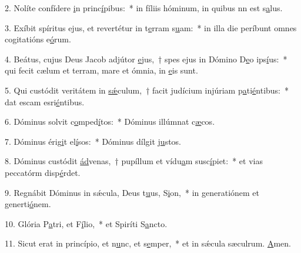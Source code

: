 2. Nolíte confídere \uline{i}n princ\uline{í}pibus:~* in fíliis hóminum, in quibus nn est s\uline{a}lus.\par 
3. Exíbit spíritus ejus, et revertétur in t\uline{e}rram s\uline{u}am:~* in illa die períbunt omnes cogitatións e\uline{ó}rum.\par 
4. Beátus, cujus Deus Jacob adjútor \uline{e}jus,~† spes ejus in Dómino D\uline{e}o ips\uline{í}us:~* qui fecit cælum et terram, mare et ómnia,  in \uline{e}is sunt.\par 
5. Qui custódit veritátem in \uline{sǽ}culum,~† facit judícium injúriam p\uline{a}ti\uline{é}ntibus:~* dat escam esri\uline{é}ntibus.\par 
6. Dóminus solvit c\uline{o}mped\uline{í}tos:~* Dóminus illúmnat c\uline{æ}cos.\par 
7. Dóminus érig\uline{i}t el\uline{í}sos:~* Dóminus dílgit j\uline{u}stos.\par 
8. Dóminus custódit \uline{ád}venas,~† pupíllum et vídu\uline{a}m susc\uline{í}piet:~* et vias peccatórm disp\uline{é}rdet.\par 
9. Regnábit Dóminus in sǽcula, Deus t\uline{u}us, S\uline{i}on,~* in generatiónem et generti\uline{ó}nem.\par 
10. Glória P\uline{a}tri, et F\uline{í}lio,~* et Spiríti S\uline{a}ncto.\par 
11. Sicut erat in princípio, et n\uline{u}nc, et s\uline{e}mper,~* et in sǽcula sæculrum. \uline{A}men.\par 
